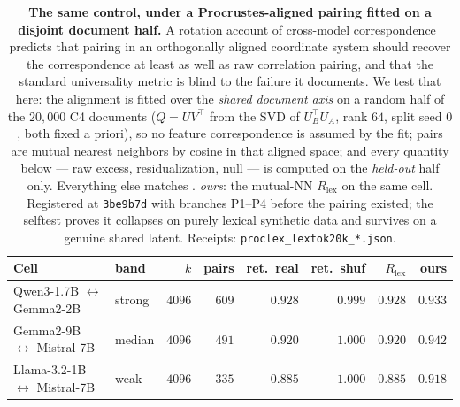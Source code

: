 \begin{table}[h]
\centering
\caption{\textbf{The same control, under a Procrustes-aligned pairing fitted on a disjoint document half.} A rotation account of cross-model correspondence~\citep{polymorphism_rotation2026} predicts that pairing in an orthogonally aligned coordinate system should recover the correspondence at least as well as raw correlation pairing, and that the standard universality metric is blind to the failure it documents. We test that here: the alignment is fitted over the \emph{shared document axis} on a random half of the $20{,}000$ C4 documents ($Q=UV^\top$ from the SVD of $U_B^\top U_A$, rank $64$, split seed $0$, both fixed a priori), so no feature correspondence is assumed by the fit; pairs are mutual nearest neighbors by cosine in that aligned space; and every quantity below --- raw excess, residualization, null --- is computed on the \emph{held-out} half only. Everything else matches . \emph{ours}: the mutual-NN $R_{\text{lex}}$ on the same cell. Registered at \texttt{3be9b7d} with branches P1--P4 before the pairing existed; the selftest proves it collapses on purely lexical synthetic data and survives on a genuine shared latent. Receipts: \texttt{proclex\_lextok20k\_*.json}.}
\label{tab:proclex}
\footnotesize
\setlength{\tabcolsep}{4pt}
\begin{tabular}{llrrrrrr}
\toprule
Cell & band & $k$ & pairs & ret.\ real & ret.\ shuf & $R_{\text{lex}}$ & ours \\
\midrule
Qwen3-1.7B $\leftrightarrow$ Gemma2-2B & strong & $4096$ & $609$ & $0.928$ & $0.999$ & $0.928$ & $0.933$ \\
Gemma2-9B $\leftrightarrow$ Mistral-7B & median & $4096$ & $491$ & $0.920$ & $1.000$ & $0.920$ & $0.942$ \\
Llama-3.2-1B $\leftrightarrow$ Mistral-7B & weak & $4096$ & $335$ & $0.885$ & $1.000$ & $0.885$ & $0.918$ \\
\bottomrule
\end{tabular}
\end{table}
